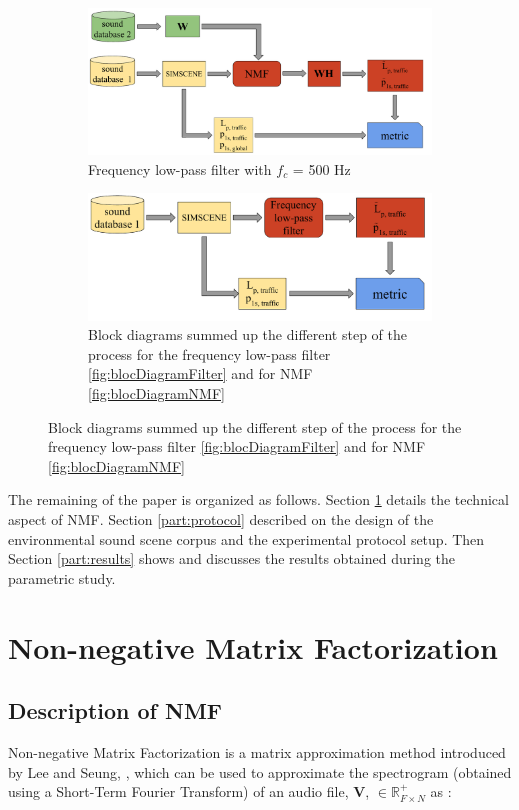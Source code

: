 \documentclass[twocolumn,a4paper,10pt]{article}
\begin{document}
\begin{figure}
    \centering
    \begin{subfigure}[t]{0.45\textwidth}
        \centering
        \includegraphics[width=.45\linewidth]{figures/bloc_diagram_NMF_EN.pdf}
        \caption{Frequency low-pass filter with $f_c$ = 500 Hz}
        \label{fig:TIR_class_filter}
    \end{subfigure}%
    \hfill
    \begin{subfigure}[t]{0.45\textwidth}
        \centering
        \includegraphics[width=.45\linewidth]{figures/bloc_diagram_filtrage_EN.pdf}
        \caption{Block diagrams summed up the different step of the process for the frequency low-pass filter \ref{fig:blocDiagramFilter} and for NMF \ref{fig:blocDiagramNMF}}
		\label{fig:TIR_class_sup}
    \end{subfigure}
\end{figure}

The remaining of the paper is organized as follows. Section \ref{part:nmf} details the technical aspect of NMF. Section \ref{part:protocol} described on the design of the environmental sound scene corpus and the experimental protocol setup. Then Section \ref{part:results} shows and discusses the results obtained during the parametric study.

\section{Non-negative Matrix Factorization}\label{part:nmf}
\subsection{Description of NMF}
Non-negative Matrix Factorization is a matrix approximation method introduced by Lee and Seung, \cite{lee_learning_1999}, which can be used to approximate the spectrogram (obtained using a Short-Term Fourier Transform) of an audio file, $\mathbf{V}$, $\in \mathbb{R}^+_{F \times N}$ as :
\end{document}
